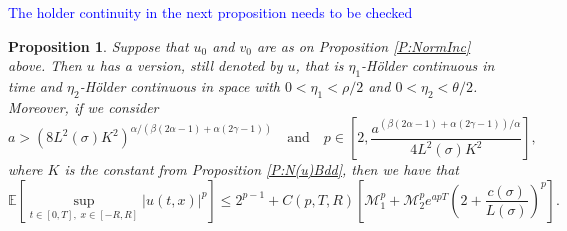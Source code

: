 \documentclass[a4paper,11pt]{article}
\numberwithin{equation}{section}
\theoremstyle{plain}
\newtheorem{proposition}[theorem]{Proposition}
\theoremstyle{definition}
\numberwithin{NQ}{section}
\numberwithin{LQ}{section}
\numberwithin{ZQ}{section}
\begin{document}
\textcolor{blue}{The holder continuity in the next proposition needs to be checked}

	
	\begin{proposition}
	\label{P:Holder}
Suppose that $u_0$ and $v_0$ are as on Proposition \ref{P:NormInc} above. Then $u$ has a version, still denoted by $u$, that is $\eta_1$-H\"older continuous in time and $\eta_2$-H\"older continuous in space with $0<\eta_1 < \rho/2$ and $0<\eta_2 < \theta/2$. Moreover, if we consider
\[
a > \left( 8 L^2(\sigma)K^2\right)^{\alpha/(\beta(2\alpha-1)+\alpha(2\gamma -1))} \quad \text{and} \quad 	p \in \left[ 2, \frac{a^{(\beta(2\alpha-1)+\alpha(2\gamma-1))/\alpha}}{4L^2(\sigma)K^2} \right],
\]
where $K$ is the constant from Proposition \ref{P:N(u)Bdd}, then we have that 
\[
\mathbb{E}\left[ \sup_{t\in[0,T],\; x\in[-R,R]} |u(t,x)|^p \right] \le 2^{p-1} + C(p,T,R) \left[ \mathcal{M}_1^p + \mathcal{M}_2^p e^{apT} \left(2 +  \frac{c(\sigma)}{L(\sigma)}\right)^p\right].
\]
	\end{proposition}
\end{document}
